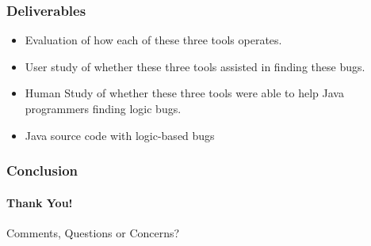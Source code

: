 \documentclass{beamer}
\begin{document}
\begin{frame}
\frametitle{Deliverables}
\begin{itemize}
\item<1-> Evaluation of how each of these three tools operates.
\item<2-> User study of whether these three tools assisted in finding these bugs.
\item<3-> Human Study of whether these three tools were able to help Java programmers finding logic bugs.
\item<4-> Java source code with logic-based bugs
\end{itemize}
\end{frame}


\begin{frame}
\frametitle{Conclusion}
\framesubtitle{Thank You!}
Comments, Questions or Concerns?
\end{frame}
\end{document}
